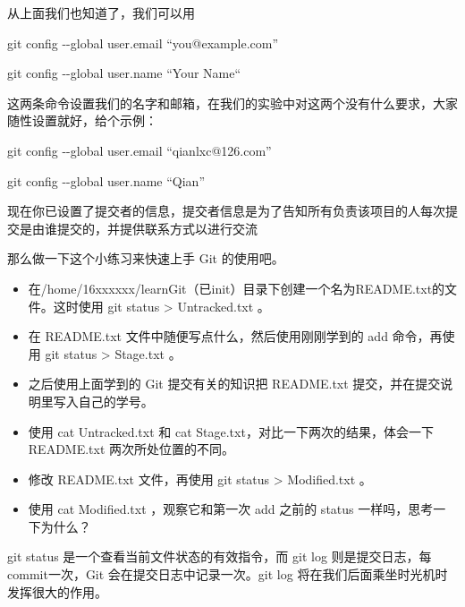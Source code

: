 \begin{note}
从上面我们也知道了，我们可以用  

  git config -{}-global user.email “you@example.com”
  
  git config -{}-global user.name “Your Name“
  
这两条命令设置我们的名字和邮箱，在我们的实验中对这两个没有什么要求，大家随性设置就好，给个示例：

  git config -{}-global user.email “qianlxc@126.com”
  
  git config -{}-global user.name “Qian”
\end{note}

现在你已设置了提交者的信息，提交者信息是为了告知所有负责该项目的人每次提交是由谁提交的，并提供联系方式以进行交流

那么做一下这个小练习来快速上手 Git 的使用吧。

\begin{exercise}
\begin{itemize}
    \item 在/home/16xxxxxx/learnGit（已init）目录下创建一个名为README.txt的文件。这时使用 git status > Untracked.txt 。
	\item 在 README.txt 文件中随便写点什么，然后使用刚刚学到的 add 命令，再使用 git status > Stage.txt 。
	\item 之后使用上面学到的 Git 提交有关的知识把 README.txt 提交，并在提交说明里写入自己的学号。
	\item 使用 cat Untracked.txt 和 cat Stage.txt，对比一下两次的结果，体会一下README.txt 两次所处位置的不同。
	\item 修改 README.txt 文件，再使用 git status > Modified.txt 。
	\item 使用 cat Modified.txt ，观察它和第一次 add 之前的 status 一样吗，思考一下为什么？
\end{itemize}
\end{exercise}

\begin{note}
git status 是一个查看当前文件状态的有效指令，而 git log 则是提交日志，每commit一次，Git 会在提交日志中记录一次。git log 将在我们后面乘坐时光机时发挥很大的作用。
\end{note}

